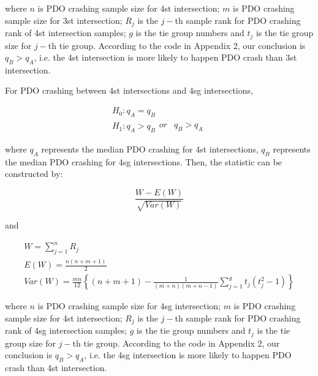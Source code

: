 \documentclass[11pt]{scrartcl} %
\begin{document}
where $n$ is PDO crashing sample size for 4st intersection; $m$ is PDO crashing sample size for 3st intersection; $R_j$ is the $j-$th sample rank for PDO crashing rank of 4st intersection samples; $g$ is the tie group numbers and $t_j$ is the tie group size for $j-$th tie group. According to the code in Appendix 2, our conclusion is ${{q_B} > {q_A}}$, i.e. the 4st intersection is more likely to happen PDO crash than 3st intersection.

\par

For PDO crashing between 4st intersections and 4sg intersections,

\begin{equation*}
\begin{array}{l}
{H_0}:{q_A} = {q_B}\\
{H_1}:{q_A} > {q_B}\begin{array}{*{20}{c}}
{or}&{{q_B} > {q_A}}
\end{array}
\end{array}
\end{equation*}

where ${q_A}$ represents the median PDO crashing for 4st intersections, $q_B$ represents the median PDO crashing for 4sg intersections. Then, the statistic can be constructed by:

\begin{equation*}
\frac{{W - E\left( W \right)}}{{\sqrt {Var\left( W \right)} }}
\end{equation*}

and

\begin{equation*}
\begin{array}{l}
W = \sum\limits_{j = 1}^n {{R_j}} \\
E\left( W \right) = \frac{{n\left( {n + m + 1} \right)}}{2}\\
Var\left( W \right) = \frac{{mn}}{{12}}\left\{ {\left( {n + m + 1} \right) - \frac{1}{{\left( {m + n} \right)\left( {m + n - 1} \right)}}\sum\limits_{j = 1}^g {{t_j}\left( {t_j^2 - 1} \right)} } \right\}
\end{array}
\end{equation*}

where $n$ is PDO crashing sample size for 4sg intersection; $m$ is PDO crashing sample size for 4st intersection; $R_j$ is the $j-$th sample rank for PDO crashing rank of 4sg intersection samples; $g$ is the tie group numbers and $t_j$ is the tie group size for $j-$th tie group. According to the code in Appendix 2, our conclusion is ${{q_B} > {q_A}}$, i.e. the 4sg intersection is more likely to happen PDO crash than 4st intersection.
\end{document}
